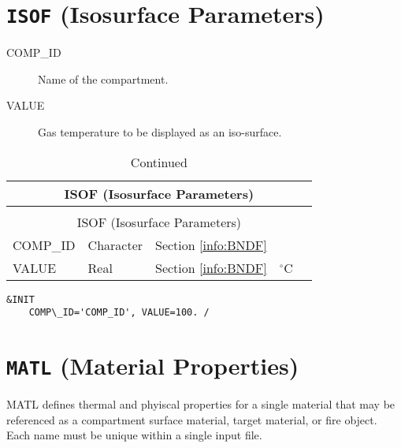 \vspace{\baselineskip}


\section{\texorpdfstring{{\tt ISOF}}{ISOF} (Isosurface Parameters)}

\begin{adjustwidth}{1cm}{0cm}
\begin{description}
  \item[COMP\_ID] Name of the compartment.
  \item[VALUE] Gas temperature to be displayed as an iso-surface.
\end{description}
\end{adjustwidth}

\vspace{\baselineskip}

\begin{longtable}{@{\extracolsep{\fill}}|l|l|l|l|l|}
\caption[Boundary file parameters ({\ct ISOF} namelist group)]{For more information see Section~\ref{info:BNDF}.}
\label{tbl:ISOF } \\
\hline
\multicolumn{5}{|c|}{{\ct ISOF} (Isosurface Parameters)} \\
\hline \hline
\endfirsthead
\caption[]{Continued} \\
\hline
\multicolumn{5}{|c|}{{\ct ISOF} (Isosurface Parameters)} \\
\hline \hline
\endhead
{\ct COMP\_ID}        & Character   & Section \ref{info:BNDF}                 &           &                 \\ \hline
{\ct VALUE}             & Real        & Section \ref{info:BNDF}                 & $^\circ$C &                 \\ \hline
\end{longtable}

\begin{lstlisting}
&INIT 
	COMP\_ID='COMP_ID', VALUE=100. /
\end{lstlisting}

\vspace{\baselineskip}


\section{\texorpdfstring{{\tt MATL}}{MATL} (Material Properties)}

MATL defines thermal and phyiscal properties for a single material that may be referenced as a compartment surface material, target material, or fire object. Each name must be unique within a single input file.

